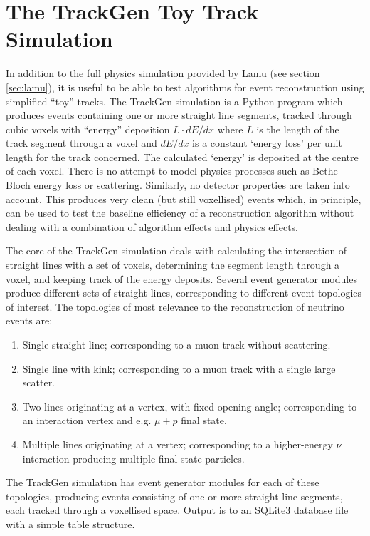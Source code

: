 \section{The TrackGen Toy Track Simulation}
In addition to the full physics simulation provided by Lamu (see section \ref{sec:lamu}), it is useful to be able to test algorithms for event reconstruction using simplified ``toy'' tracks. The TrackGen simulation is a Python program which produces events containing one or more straight line segments, tracked through cubic voxels with ``energy'' deposition $L\cdot dE/dx$ where $L$ is the length of the track segment through a voxel and $dE/dx$ is a constant `energy loss' per unit length for the track concerned. The calculated `energy' is deposited at the centre of each voxel. There is no attempt to model physics processes such as Bethe-Bloch energy loss or scattering. Similarly, no detector properties are taken into account. This produces very clean (but still voxellised) events which, in principle, can be used to test the baseline efficiency of a reconstruction algorithm without dealing with a combination of algorithm effects and physics effects.

The core of the TrackGen simulation deals with calculating the intersection of straight lines with a set of voxels, determining the segment length through a voxel, and keeping track of the energy deposits. Several event generator modules produce different sets of straight lines, corresponding to different event topologies of interest. The topologies of most relevance to the reconstruction of neutrino events are:

\begin{enumerate}
    \item Single straight line; corresponding to a muon track without scattering.
    \item Single line with kink; corresponding to a muon track with a single large scatter.
    \item Two lines originating at a vertex, with fixed opening angle; corresponding to an interaction vertex and e.g. $\mu + p$ final state.
    \item Multiple lines originating at a vertex; corresponding to a higher-energy $\nu$ interaction producing multiple final state particles.
\end{enumerate}

The TrackGen simulation has event generator modules for each of these topologies, producing events consisting of one or more straight line segments, each tracked through a voxellised space. Output is to an SQLite3\citep{SQLite} database file with a simple table structure.

